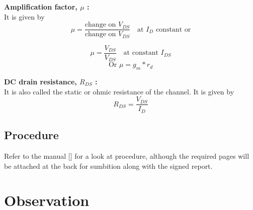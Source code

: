 \documentclass[%
sor,
 jor,
 amsmath,amssymb,
 reprint,
]{revtex4-2}
\begin{document}
\textbf{Amplification factor, $\mu$ :}\\
It is given by
\[
\mu = \frac{\text{change on } V_{DS}}{\text{change on } V_{DS}} \quad \text{at } I_D \text{ constant or}
\]

\[
\mu = \frac{V_{DS}}{V_{DS}} \quad \text{at constant } I_{DS}
\]
\begin{equation}
\text{Or } \mu = g_m * r_d
\end{equation}

\textbf{DC drain resistance, $R_{DS}$ :}\\
It is also called the static or ohmic resistance of the channel. It is given by
\begin{equation}
R_{DS} = \frac{V_{DS}}{I_D}
\end{equation}
\subsection{Procedure}Refer to the manual [\cite{ph3244repo}] for a look at procedure, although the required pages will be attached at the back for sumbition along with the signed report.

\section{Observation}
\end{document}
